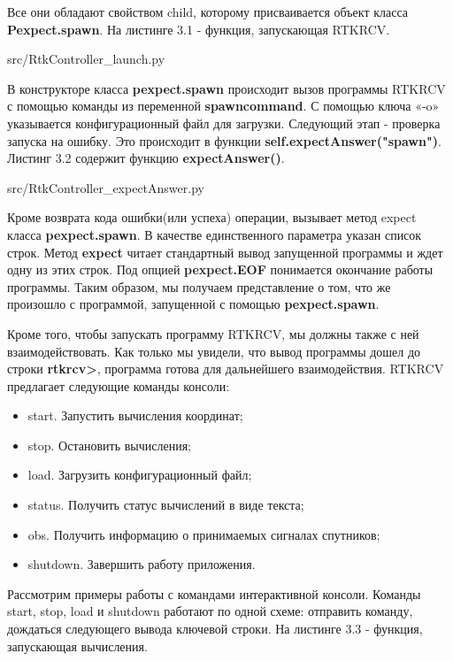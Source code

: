 Все они обладают свойством child, которому присваивается объект класса \textbf{Pexpect.spawn}. На листинге 3.1 - функция, запускающая RTKRCV.


{src/RtkController_launch.py}

В конструкторе класса \textbf{pexpect.spawn} происходит вызов программы RTKRCV с помощью команды из переменной \textbf{spawn\textunderscore command}. С помощью ключа «-o» указывается конфигурационный файл для загрузки. Следующий этап - проверка запуска на ошибку. Это происходит в функции \textbf{self.expectAnswer("spawn")}. Листинг 3.2 содержит функцию \textbf{expectAnswer()}.


{src/RtkController_expectAnswer.py}

Кроме возврата кода ошибки(или успеха) операции, вызывает метод expect класса \textbf{pexpect.spawn}. В качестве единственного параметра указан список строк. Метод \textbf{expect} читает стандартный вывод запущенной программы и ждет одну из этих строк. Под опцией \textbf{pexpect.EOF} понимается окончание работы программы. Таким образом, мы получаем представление о том, что же произошло с программой, запущенной с помощью \textbf{pexpect.spawn}.

Кроме того, чтобы запускать программу RTKRCV, мы должны также с ней взаимодействовать. Как только мы увидели, что вывод программы дошел до строки \textbf{rtkrcv>}, программа готова для дальнейшего взаимодействия. RTKRCV предлагает следующие команды консоли:

\begin{itemize}
  \item start. Запустить вычисления координат;
  \item stop. Остановить вычисления;
  \item load. Загрузить конфигурационный файл;
  \item status. Получить статус вычислений в виде текста;
  \item obs. Получить информацию о принимаемых сигналах спутников;
  \item shutdown. Завершить работу приложения.
\end{itemize}

Рассмотрим примеры работы с командами интерактивной консоли. Команды start, stop, load и shutdown работают по одной схеме: отправить команду, дождаться следующего вывода ключевой строки. На листинге 3.3 - функция, запускающая вычисления.

